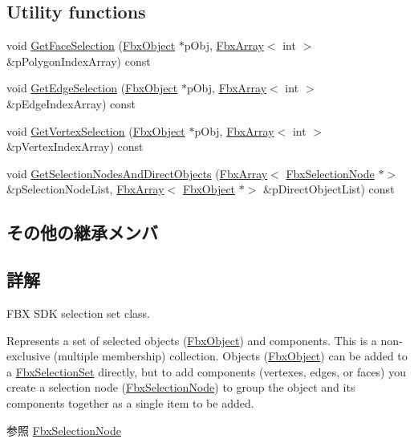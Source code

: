 \subsection*{Utility functions}
\begin{DoxyCompactItemize}
\item 
void \hyperlink{class_fbx_selection_set_ae304339bd66b4edca36c3f74517cb762}{Get\+Face\+Selection} (\hyperlink{class_fbx_object}{Fbx\+Object} $\ast$p\+Obj, \hyperlink{class_fbx_array}{Fbx\+Array}$<$ int $>$ \&p\+Polygon\+Index\+Array) const
\item 
void \hyperlink{class_fbx_selection_set_a1c3c07b58ae08bf77ce044be79dff6c4}{Get\+Edge\+Selection} (\hyperlink{class_fbx_object}{Fbx\+Object} $\ast$p\+Obj, \hyperlink{class_fbx_array}{Fbx\+Array}$<$ int $>$ \&p\+Edge\+Index\+Array) const
\item 
void \hyperlink{class_fbx_selection_set_a4ec4d2f7e801768d621430636e849101}{Get\+Vertex\+Selection} (\hyperlink{class_fbx_object}{Fbx\+Object} $\ast$p\+Obj, \hyperlink{class_fbx_array}{Fbx\+Array}$<$ int $>$ \&p\+Vertex\+Index\+Array) const
\item 
void \hyperlink{class_fbx_selection_set_af0b2e85e61badfce8f700df48a8c0e50}{Get\+Selection\+Nodes\+And\+Direct\+Objects} (\hyperlink{class_fbx_array}{Fbx\+Array}$<$ \hyperlink{class_fbx_selection_node}{Fbx\+Selection\+Node} $\ast$$>$ \&p\+Selection\+Node\+List, \hyperlink{class_fbx_array}{Fbx\+Array}$<$ \hyperlink{class_fbx_object}{Fbx\+Object} $\ast$$>$ \&p\+Direct\+Object\+List) const
\end{DoxyCompactItemize}
\subsection*{その他の継承メンバ}


\subsection{詳解}
F\+BX S\+DK selection set class.

Represents a set of selected objects (\hyperlink{class_fbx_object}{Fbx\+Object}) and components. This is a non-\/exclusive (multiple membership) collection. Objects (\hyperlink{class_fbx_object}{Fbx\+Object}) can be added to a \hyperlink{class_fbx_selection_set}{Fbx\+Selection\+Set} directly, but to add components (vertexes, edges, or faces) you create a selection node (\hyperlink{class_fbx_selection_node}{Fbx\+Selection\+Node}) to group the object and its components together as a single item to be added. \begin{DoxySeeAlso}{参照}
\hyperlink{class_fbx_selection_node}{Fbx\+Selection\+Node} 
\end{DoxySeeAlso}


